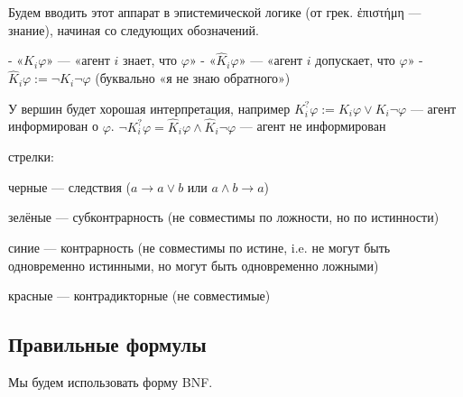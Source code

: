 \documentclass[openany]{book}
\theoremstyle{plain}
\theoremstyle{definition}
\begin{document}
Будем вводить этот аппарат в эпистемической логике (от грек. \textgreek{ἐπιστήμη} --- знание), начиная со следующих обозначений.

- «\(K_i \varphi\)» — «агент \(i\) знает, что \(\varphi\)»
- «\(\hat{K}_i \varphi\)» — «агент \(i\) допускает, что \(\varphi\)»
- \(\hat{K}_i \varphi := \neg K_i \neg \varphi\) (буквально «я не знаю обратного»)


У вершин будет хорошая интерпретация, например \(K^{?}_i \varphi := K_i \varphi \lor K_i \neg \varphi\) — агент информирован о \(\varphi\). \(\neg K^{?}_i \varphi = \hat{K}_i \varphi \land \hat{K}_i \neg \varphi\) — агент не информирован

стрелки:

черные — следствия (\(a \to a \lor b\) или \(a \land b \to a\))

зелёные — субконтрарность (не совместимы по ложности, но по истинности)

синие — контрарность (не совместимы по истине, i.e. не могут быть одновременно истинными, но могут быть одновременно ложными)

красные — контрадикторные (не совместимые)

\subsection{ Правильные формулы }

Мы будем использовать форму BNF.
\end{document}
